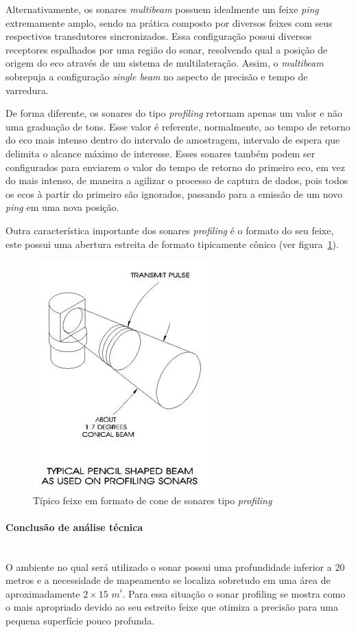 Alternativamente, os sonares \emph{multibeam} possuem idealmente um feixe \emph{ping} extremamente amplo, sendo na prática composto por diversos feixes com seus respectivos transdutores sincronizados. Essa configuração possui diversos receptores espalhados por uma região do sonar, resolvendo qual a posição de origem do eco através de um sistema de multilateração. Assim, o \emph{multibeam} sobrepuja a configuração \emph{single beam} no aspecto de precisão e tempo de varredura.

De forma diferente, os sonares do tipo \emph{profiling} retornam apenas um valor e não uma graduação de tons. Esse valor é referente, normalmente, ao tempo de retorno do eco mais intenso dentro do intervalo de amostragem, intervalo de espera que delimita o alcance máximo de interesse. Esses sonares também podem ser configurados para enviarem o valor do tempo de retorno do primeiro eco, em vez do mais intenso, de maneira a agilizar o processo de captura de dados, pois todos os ecos à partir do primeiro são ignorados, passando para a emissão de um novo \emph{ping} em uma nova posição.

Outra característica importante dos sonares \emph{profiling} é o formato do seu feixe, este possui uma abertura estreita de formato tipicamente cônico (ver figura~\ref{sonar_3}).

\begin{figure}[H]
    \centering
    \includegraphics[width=0.5\columnwidth]{figs/sonar/3.jpg}
    \caption{Típico feixe em formato de cone de sonares tipo \emph{profiling}}
    \label{sonar_3}
\end{figure}



 \paragraph{Conclusão de análise técnica}\mbox{}\\
 O ambiente no qual será utilizado o sonar possui uma profundidade inferior a 20 metros e a necessidade de mapeamento se localiza sobretudo em uma área de aproximadamente $2 \times 15$ $m^²$. Para essa situação o sonar profiling se mostra como o mais apropriado devido ao seu estreito feixe que otimiza a precisão para uma pequena superfície pouco profunda.
